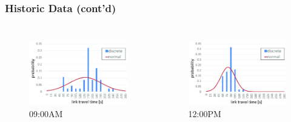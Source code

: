 \documentclass[t]{beamer}
\begin{document}
\begin{frame}\frametitle{Historic Data \small{(cont'd)}}
\vspace{-0.45in}
\begin{columns}
	\begin{figure}
		\centering
		\includegraphics[scale=0.2]{ltt_0900.jpg}
		\vspace{-0.05in}
		\\ 09:00AM
	\end{figure}
	\begin{figure}
		\centering
		\includegraphics[scale=0.2]{ltt_1200.jpg}
		\vspace{-0.05in}
		\\ 12:00PM
	\end{figure}
\end{columns}
\begin{center}
	\begin{figure}
		\centering

\end{figure}
\end{center}
\end{frame}
\end{document}
